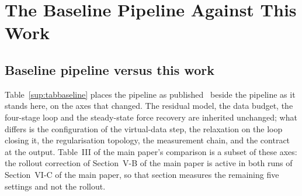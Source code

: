 \section{The Baseline Pipeline Against This Work}
\label{sup:baseline}

\subsection{Baseline pipeline versus this work}
\label{sup:baselinecmp}

Table~\ref{sup:tabbaseline} places the pipeline as published~\cite{ontrack2025}
beside the pipeline as it stands here, on the axes that changed. The residual
model, the data budget, the four-stage loop and the steady-state force recovery
are inherited unchanged; what differs is the configuration of the virtual-data
step, the relaxation on the loop closing it, the regularisation topology, the
measurement chain, and the contract at
the output. Table~III of the main paper's comparison is a subset of these axes:
the rollout correction of Section~V-B of the main paper is active in both
runs of Section~VI-C of the main paper, so that section measures the remaining
five settings and not the rollout.

